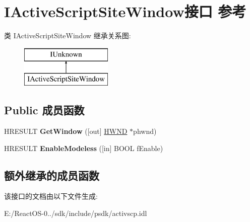 \hypertarget{interface_i_active_script_site_window}{}\section{I\+Active\+Script\+Site\+Window接口 参考}
\label{interface_i_active_script_site_window}
类 I\+Active\+Script\+Site\+Window 继承关系图\+:\begin{figure}[H]
\begin{center}
\leavevmode
\includegraphics[height=2.000000cm]{interface_i_active_script_site_window}
\end{center}
\end{figure}
\subsection*{Public 成员函数}
\begin{DoxyCompactItemize}
\item 
\mbox{\label{interface_i_active_script_site_window_acea3c483dec52dc646afc42c4997e922}} 
H\+R\+E\+S\+U\+LT {\bfseries Get\+Window} (\mbox{[}out\mbox{]} \hyperlink{interfacevoid}{H\+W\+ND} $\ast$phwnd)
\item 
\mbox{\label{interface_i_active_script_site_window_abe0f0069483e7422a27509148a477951}} 
H\+R\+E\+S\+U\+LT {\bfseries Enable\+Modeless} (\mbox{[}in\mbox{]} B\+O\+OL f\+Enable)
\end{DoxyCompactItemize}
\subsection*{额外继承的成员函数}


该接口的文档由以下文件生成\+:\begin{DoxyCompactItemize}
\item 
E\+:/\+React\+O\+S-\/0../sdk/include/psdk/activscp.\+idl\end{DoxyCompactItemize}
